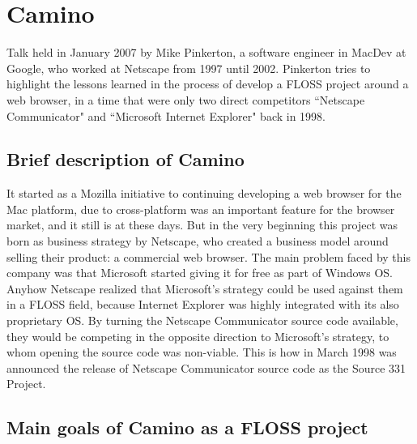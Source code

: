 \documentclass[11pt]{article} %
\begin{document}
\section{Camino}

Talk held in January 2007 by Mike Pinkerton, a software engineer in MacDev at Google, who worked at Netscape from 1997 until 2002. Pinkerton tries to highlight the lessons learned in the process of develop a FLOSS project around a web browser, in a time that were only two direct competitors ``Netscape Communicator" and ``Microsoft Internet Explorer" back in 1998.

\subsection{Brief description of Camino}

It started as a Mozilla initiative to continuing developing a web browser for the Mac platform, due to cross-platform was an important feature for the browser market, and it still is at these days. But in the very beginning this project was born as business strategy by Netscape, who created a business model around selling their product: a commercial web browser. The main problem faced by this company was that Microsoft started giving it for free as part of Windows OS. Anyhow Netscape realized that Microsoft's strategy could be used against them in a FLOSS field, because Internet Explorer was highly integrated with its also proprietary OS. By turning the Netscape Communicator source code available, they would be competing in the opposite direction to Microsoft's strategy, to whom opening the source code was non-viable. This is how in March 1998 was announced the release of Netscape Communicator source code as the Source 331 Project.

\subsection{Main goals of Camino as a FLOSS project}
\end{document}
